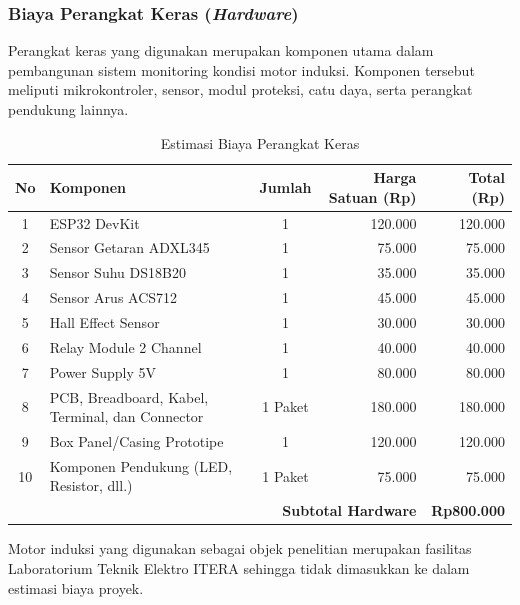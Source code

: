 \documentclass{elsinta}
\begin{document}
\subsubsection{Biaya Perangkat Keras (\textit{Hardware})}

Perangkat keras yang digunakan merupakan komponen utama dalam pembangunan sistem monitoring kondisi motor induksi. Komponen tersebut meliputi mikrokontroler, sensor, modul proteksi, catu daya, serta perangkat pendukung lainnya.

\begin{table}[H]
\centering
\caption{Estimasi Biaya Perangkat Keras}
\label{tab:harga}

\begin{tabular}{|c|p{5.8cm}|c|r|r|}
\hline
\textbf{No} &
\centering\textbf{Komponen} &
\textbf{Jumlah} &
\textbf{Harga Satuan (Rp)} &
\textbf{Total (Rp)}\\
\hline

1 & ESP32 DevKit & 1 & 120.000 & 120.000\\
\hline
2 & Sensor Getaran ADXL345 & 1 & 75.000 & 75.000\\
\hline
3 & Sensor Suhu DS18B20 & 1 & 35.000 & 35.000\\
\hline
4 & Sensor Arus ACS712 & 1 & 45.000 & 45.000\\
\hline
5 & Hall Effect Sensor & 1 & 30.000 & 30.000\\
\hline
6 & Relay Module 2 Channel & 1 & 40.000 & 40.000\\
\hline
7 & Power Supply 5V & 1 & 80.000 & 80.000\\
\hline
8 & PCB, Breadboard, Kabel, Terminal, dan Connector & 1 Paket & 180.000 & 180.000\\
\hline
9 & Box Panel/Casing Prototipe & 1 & 120.000 & 120.000\\
\hline
10 & Komponen Pendukung (LED, Resistor, dll.) & 1 Paket & 75.000 & 75.000\\
\hline

\multicolumn{4}{|r|}{\textbf{Subtotal Hardware}} &
\textbf{Rp800.000}\\
\hline

\end{tabular}
\end{table}

Motor induksi yang digunakan sebagai objek penelitian merupakan fasilitas Laboratorium Teknik Elektro ITERA sehingga tidak dimasukkan ke dalam estimasi biaya proyek.

\end{document}
